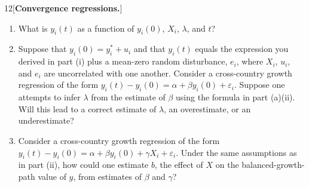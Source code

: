 \begin{problem}{12}[\textbf{Convergence regressions.}]
\begin{enumerate}[label=(\alph*)]
\begin{enumerate}[label=(\roman*)]
        \item What is \(y_i\left(t\right)\) as a function of \(y_i\left(0\right)\), \(X_i\), \(\lambda\), and \(t\)?
        \item Suppose that \(y_i\left(0\right)=y_i^*+u_i\) and that \(y_i\left(t\right)\) equals the expression you derived in part (i) plus a mean-zero random disturbance, \(e_i\), where \(X_i\), \(u_i\), and \(e_i\) are uncorrelated with one another. Consider a cross-country growth regression of the form \(y_i\left(t\right)-y_i\left(0\right)=\alpha+\beta y_i\left(0\right)+\varepsilon_i\). Suppose one attempts to infer \(\lambda\) from the estimate of \(\beta\) using the formula in part (a)(ii). Will this lead to a correct estimate of \(\lambda\), an overestimate, or an underestimate?
        \item Consider a cross-country growth regression of the form \(y_i\left(t\right)-y_i\left(0\right)=\alpha+\beta y_i\left(0\right)+\gamma X_i+\varepsilon_i\). Under the same assumptions as in part (ii), how could one estimate \(b\), the effect of \(X\) on the balanced-growth-path value of \(y\), from estimates of \(\beta\) and \(\gamma\)?
    \end{enumerate}
\end{enumerate}
\end{problem}
